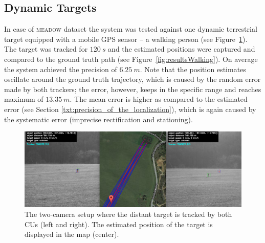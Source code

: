 \subsection{Dynamic Targets}

In case of \textsc{meadow} dataset the system was tested against one dynamic terrestrial target equipped with a mobile GPS sensor -- a walking person (see Figure~\ref{fig:trackingAndMap}). The target was tracked for $120~s$ and the estimated positions were captured and compared to the ground truth path (see Figure~\ref{fig:resultsWalking}). On average the system achieved the precision of $6.25~m$. Note that the position estimates oscillate around the ground truth trajectory, which is caused by the random error made by both trackers; the error, however, keeps in the specific range and reaches maximum of $13.35~m$. The mean error is higher as compared to the estimated error (see Section \ref{txt:precision_of_the_localization}), which is again caused by the systematic error (imprecise rectification and stationing).

\begin{figure}[!h]\centering
	\centering
	\includegraphics[width=0.98\linewidth]{fig/tracking_and_map.png}
	\caption{The two-camera setup where the distant target is tracked by both CUs (left and right). The estimated position of the target is displayed in the map (center).}
	\label{fig:trackingAndMap}
\end{figure}

